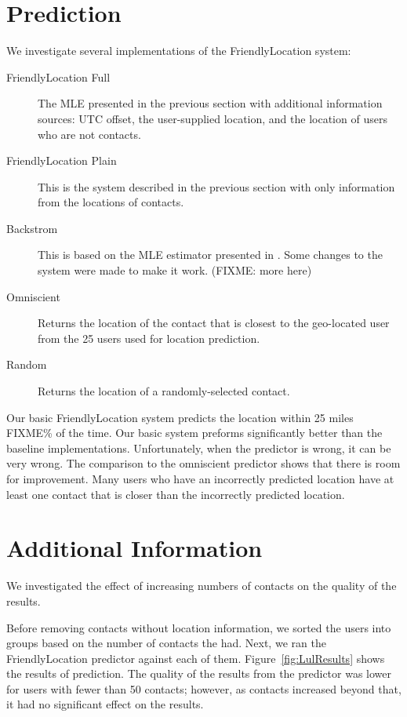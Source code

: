 \section{Prediction}
We investigate several implementations of the FriendlyLocation system:
\begin{description}
\item[FriendlyLocation Full] The MLE presented in the previous section with
    additional information sources: UTC offset, the user-supplied location,
    and the location of users who are not contacts.
\item[FriendlyLocation Plain] This is the system described in the previous
    section with only information from the locations of contacts.
\item[Backstrom] This is based on the MLE estimator presented in
    \cite{backstro m2010find}. Some changes to the system were made to make it
    work. (FIXME: more here)
\item[Omniscient] Returns the location of the contact that is closest to the
    geo-located user from the 25 users used for location prediction.
\item[Random] Returns the location of a randomly-selected contact.
\end{description}

Our basic FriendlyLocation system predicts the location within 25 miles FIXME\% of
the time.
%
Our basic system preforms significantly better than the baseline implementations.
%
Unfortunately, when the predictor is wrong, it can be very wrong.
%
The comparison to the omniscient predictor shows that there is room for improvement.
%
Many users who have an incorrectly predicted location have at least one contact
that is closer than the incorrectly predicted location.

\section{Additional Information}
We investigated the effect of increasing numbers of contacts on the quality of
the results.

Before removing contacts without location information, we sorted the users into
groups based on the number of contacts the had.
Next, we ran the FriendlyLocation predictor against each of them.
Figure~\ref{fig:LulResults} shows the results of prediction.
The quality of the results from the predictor was lower for users with fewer
than 50 contacts; however, as contacts increased beyond that, it had no
significant effect on the results.

